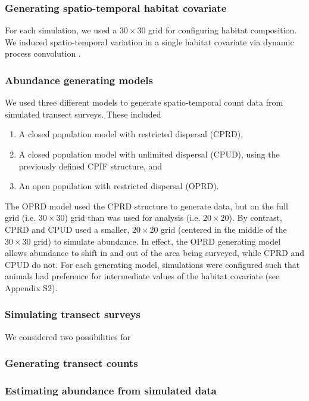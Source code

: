 \documentclass[times,mee,doublespace,]{besauth2}
\begin{document}
\subsubsection{Generating spatio-temporal habitat covariate}

For each simulation, we used a $30 \times 30$ grid for configuring habitat composition.  We induced spatio-temporal variation in a single habitat covariate via dynamic process convolution \citep[][; e.g. Fig. \ref{fig:sim_generic_maps}]{CalderEtAl2002}.

\subsubsection{Abundance generating models}

We used three different models to generate spatio-temporal count data from simulated transect surveys.  These included
\begin{enumerate}
   \item  A closed population model with restricted dispersal (CPRD),
   \item A closed population model with unlimited dispersal (CPUD), using the previously defined CPIF structure, and
   \item An open population with restricted dispersal (OPRD).
\end{enumerate}
The OPRD model used the CPRD structure to generate data, but on the full grid (i.e. $30 \times 30$) grid than was used for analysis (i.e. $20 \times 20$).  By contrast, CPRD and CPUD used a smaller, $20 \times 20$ grid (centered in the middle of the $30 \times 30$ grid) to simulate abundance.  In effect, the OPRD generating model allows abundance to shift in and out of the area being surveyed, while CPRD and CPUD do not.  For each generating model, simulations were configured such that animals had preference for intermediate values of the habitat covariate (see Appendix S2).

\subsubsection{Simulating transect surveys}

We considered two possibilities for 

\subsubsection{Generating transect counts}

\subsubsection{Estimating abundance from simulated data}
\end{document}
